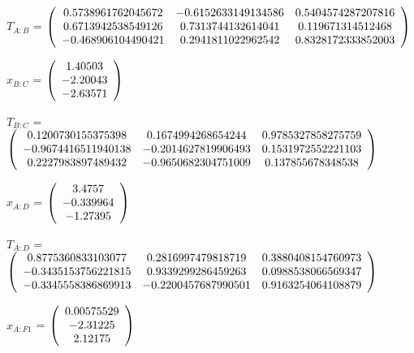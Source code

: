 \begin{description}
$T_{A:B}$ = $\left( \begin{array} {ccc} 
   0.5738961762045672 & -0.6152633149134586 & 0.5404574287207816 \\ 
   0.6713942538549126 & 0.7313744132614041 & 0.119671314512468 \\ 
   -0.468906104490421 & 0.2941811022962542 & 0.8328172333852003 \\
\end{array} \right)\\ \\$

$x_{B:C}$ = $\left( \begin{array} {ccc}    1.40503 \\   -2.20043 \\   -2.63571 
\end{array} \right)\\ \\$

$T_{B:C}$ = $\left( \begin{array} {ccc} 
   0.1200730155375398 & 0.1674994268654244 & 0.9785327858275759 \\ 
   -0.9674416511940138 & -0.2014627819906493 & 0.1531972552221103 \\ 
   0.2227983897489432 & -0.9650682304751009 & 0.137855678348538 \\
\end{array} \right)\\ \\$

$x_{A:D}$ = $\left( \begin{array} {ccc}     3.4757 \\  -0.339964 \\   -1.27395 
\end{array} \right)\\ \\$

$T_{A:D}$ = $\left( \begin{array} {ccc} 
   0.8775360833103077 & 0.2816997479818719 & 0.3880408154760973 \\ 
   -0.3435153756221815 & 0.9339299286459263 & 0.0988538066569347 \\ 
   -0.3345558386869913 & -0.2200457687990501 & 0.9163254064108879 \\
\end{array} \right)\\ \\$

$x_{A:F1}$ = $\left( \begin{array} {ccc} 0.00575529 \\   -2.31225 \\    2.12175 
\end{array} \right)\\ \\$


\end{description}
